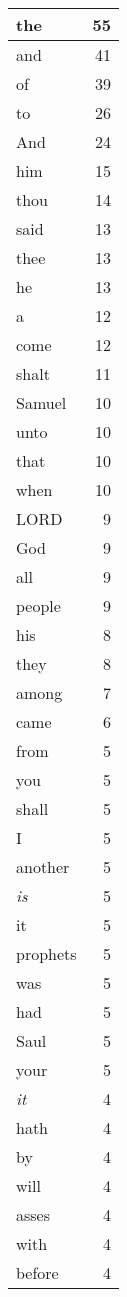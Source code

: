 \begin{center}
\begin{longtable}{l|r}
\hline \hline
\endlastfoot
the & 55 \\ \hline
and & 41 \\ \hline
of & 39 \\ \hline
to & 26 \\ \hline
And & 24 \\ \hline
him & 15 \\ \hline
thou & 14 \\ \hline
said & 13 \\ \hline
thee & 13 \\ \hline
he & 13 \\ \hline
a & 12 \\ \hline
come & 12 \\ \hline
shalt & 11 \\ \hline
Samuel & 10 \\ \hline
unto & 10 \\ \hline
that & 10 \\ \hline
when & 10 \\ \hline
LORD & 9 \\ \hline
God & 9 \\ \hline
all & 9 \\ \hline
people & 9 \\ \hline
his & 8 \\ \hline
they & 8 \\ \hline
among & 7 \\ \hline
came & 6 \\ \hline
from & 5 \\ \hline
you & 5 \\ \hline
shall & 5 \\ \hline
I & 5 \\ \hline
another & 5 \\ \hline
\emph{is} & 5 \\ \hline
it & 5 \\ \hline
prophets & 5 \\ \hline
was & 5 \\ \hline
had & 5 \\ \hline
Saul & 5 \\ \hline
your & 5 \\ \hline
\emph{it} & 4 \\ \hline
hath & 4 \\ \hline
by & 4 \\ \hline
will & 4 \\ \hline
asses & 4 \\ \hline
with & 4 \\ \hline
before & 4 \\ \hline

\end{longtable}
\end{center}
